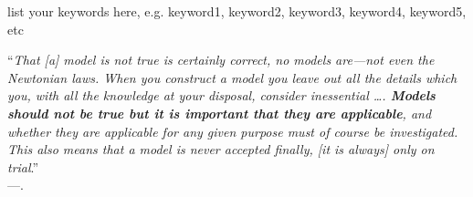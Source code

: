 \documentclass[11pt,3p,twocolumn]{JMN}
\begin{document}
\begin{frontmatter}
\begin{keyword}
list your keywords here, e.g.  keyword1, keyword2, keyword3, keyword4, keyword5, etc

\vspace*{1\baselineskip}
\hspace*{0.05\textwidth}\begin{minipage}{0.9\textwidth}

\noindent ``\small{\textit{That \textnormal{[a]} model is not true is certainly correct, no models are—not even the Newtonian laws. When you construct a model you leave out all the details which you, with all the knowledge at your disposal, consider inessential \ldots. \textbf{Models should not be true but it is important that they are applicable}, and whether they are applicable for any given purpose must of course be investigated. This also means that a model is never accepted finally, \textnormal{[it is always]} only on trial}.}''\\
---\citet[pp.\,37--38]{rasch80}.\\
\end{minipage}

\end{keyword}

\end{frontmatter}

\end{document}
